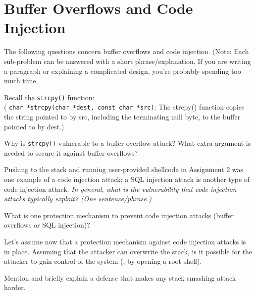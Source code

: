 \section{Buffer Overflows and Code Injection}

The following questions concern buffer overflows and code injection. 
(Note: Each sub-problem can be answered with a short phrase/explanation. If
you are writing a paragraph or explaining a complicated design, you're
probably spending too much time.

Recall the {\tt strcpy()} function: 
\\( {\tt char *strcpy(char *dest, const char *src)}: The strcpy() function copies
the string pointed to by src, including the terminating null byte, to the buffer pointed to by dest.)

Why is {\tt strcpy()} vulnerable to a buffer overflow attack? What extra
argument is needed to secure it against buffer overflows?

\eprob
\vspace*{0.5in}

Pushing to the stack and running user-provided shellcode in Assignment
2 was one example of a code injection attack; a SQL injection attack is another
type of code injection attack. 
{\em In general, what is the vulnerability that code injection attacks typically
exploit? (One sentence/phrase.)} 

\eprob
\vspace*{0.5in}

 What is one protection mechanism to prevent code injection attacks (buffer
overflows or SQL injection)?

\eprob
\vspace*{0.5in}

 Let's assume now that a protection mechanism against code injection
attacks is in place. Assuming that the attacker can overwrite the stack, is it
possible for the attacker to gain control of the system (\eg, by opening a root
shell).

\eprob

\item Mention and briefly explain a defense that makes any stack smashing attack
harder.

\eprob
\fi



